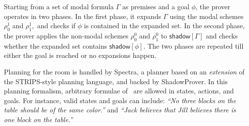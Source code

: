 Starting from a set of modal formula $\Gamma$ as premises and a goal
$\phi$, the prover operates in two phases. In the first phase, it
expands $\Gamma$ using the modal schemes $\rho^1_{0}$ and
$\rho^1_{1}, $ and checks if $\phi$ is contained in the expanded
set. In the second phase, the prover applies the non-modal schemes
$\rho^0_{0} $ and $\rho^0_{1}$ to $\mathsf{shadow}[\Gamma]$ and checks whether
the expanded set contains $\mathsf{shadow}[\phi]$. The two phases are repeated
till either the goal is reached or no expansions happen.

Planning for the room is handled by \textsf{Spectra}, a planner based
on an \emph{extension} of the STRIPS-style
planning language, and backed by \textsf{ShadowProver}. In this planning formalism, arbitrary
formulae of \DCEC\ are allowed in states, actions, and goals.  For
instance, valid states and goals can include: \emph{``No three blocks
on the table should be of the same color.''}  and \emph{``Jack
believes that Jill believes there is one block on the table.''}

